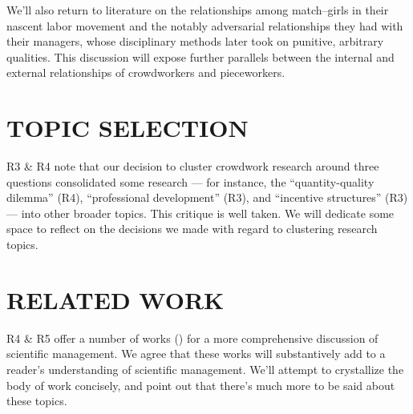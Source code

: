 \documentclass[11pt]{article}
\begin{document}

We'll also return to literature on the relationships
among match--girls in their nascent labor movement and
the notably adversarial relationships they had with their managers,
whose disciplinary methods later took on
punitive, arbitrary qualities.
This discussion will expose further parallels between
the internal and external relationships
of crowdworkers and pieceworkers.





\section*{TOPIC SELECTION}
R3 \& R4 note that our decision to cluster crowdwork research around three questions
consolidated some research
--- for instance,
the ``quantity-quality dilemma'' (R4),
``professional development'' (R3),
and ``incentive structures'' (R3) --- into other broader topics.
This critique is well taken.
We will dedicate some space to reflect on
the decisions we made with regard to clustering research topics.

\section*{RELATED WORK}
R4 \& R5 offer a number of works
(\cite[e.g.][]{williamson2016})
for a more comprehensive discussion of scientific management.
We agree that these works will
substantively add to a reader's understanding of scientific management.
We'll attempt to crystallize the body of work concisely, and
point out that there's much more to be said about these topics.
\end{document}
